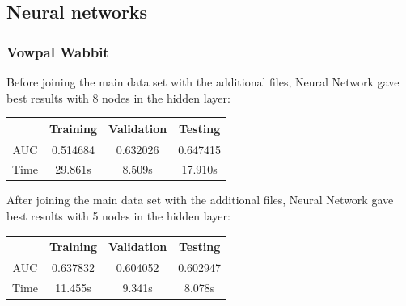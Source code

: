 \documentclass[10pt]{article}
\begin{document}
\subsection{Neural networks}
\subsubsection{Vowpal Wabbit}
Before joining the main data set with the additional files, Neural Network gave best results with 8 nodes in the hidden layer:\\

\begin{center}
 \begin{tabular}{|c | c | c | c||} 
 \hline
 & Training & Validation & Testing\\ [0.5ex] 
 \hline\hline
AUC & 0.514684 & 0.632026 & 0.647415\\
 \hline
Time & 29.861s & 8.509s & 17.910s\\ 
 \hline
\end{tabular}
\end{center}
After joining the main data set with the additional files, Neural Network gave best results with 5 nodes in the hidden layer:\\

\begin{center}
 \begin{tabular}{|c | c | c | c||} 
 \hline
 & Training & Validation & Testing\\ [0.5ex] 
 \hline\hline
AUC & 0.637832 & 0.604052 & 0.602947\\
 \hline
Time & 11.455s & 9.341s & 8.078s\\ 
 \hline
\end{tabular}
\end{center}
\end{document}
